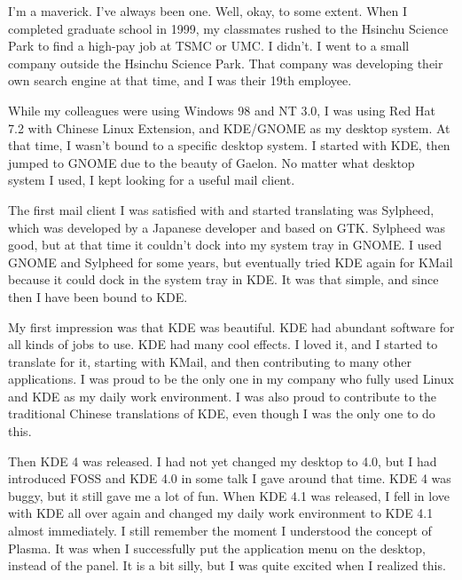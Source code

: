 

\noindent{}I'm a maverick. I've always been one. Well, okay, to some extent.
When I completed graduate school in 1999, my classmates
rushed to the Hsinchu Science Park to find a high-pay job at TSMC
or UMC. I didn't. I went to a small company outside the Hsinchu Science
Park. That company was developing their own search engine at that time,
and I was their 19th employee.

While my colleagues were using Windows 98 and NT 3.0, I was using Red Hat
7.2 with Chinese Linux Extension, and KDE/GNOME as my desktop system.
At that time, I wasn't bound to a specific desktop system. I started
with KDE, then jumped to GNOME due to the beauty of Gaelon. No matter what 
desktop system I used, I kept looking for a useful mail client.

The first mail client I was satisfied with and started translating was
Sylpheed, which was developed by a Japanese developer and based on
GTK. Sylpheed was good, but at that time it couldn't dock into my system
tray in GNOME. I used GNOME and Sylpheed for some years, but eventually 
tried KDE again for KMail because it could dock in the system tray in KDE. 
It was that simple, and since then I have been bound to KDE.

My first impression was that KDE was beautiful. KDE had abundant software for all kinds of jobs
to use. KDE had many cool effects. I loved it, and I started to translate
for it, starting with KMail, and then contributing to many other applications. I was proud to
be the only one in my company who fully used Linux and KDE as my daily
work environment. I was also proud to contribute to the traditional
Chinese translations of KDE, even though I was the only one to do
this.

Then KDE 4 was released. I had not yet changed my desktop to 4.0,
but I had introduced FOSS and KDE 4.0 in some talk I gave around that time. KDE 4
was buggy, but it still gave me a lot of fun. When KDE 4.1 was released, I
fell in love with KDE all over again and changed my daily work environment to
KDE 4.1 almost immediately. I still remember the moment I understood
the concept of Plasma. It was when I successfully put the application
menu on the desktop, instead of the panel. It is a bit silly,
but I was quite excited when I realized this.

